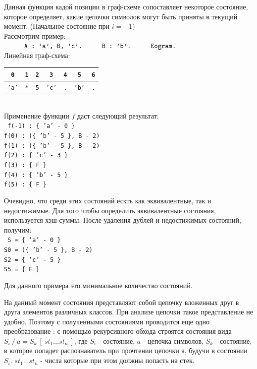 \documentclass[12pt]{article}
\newcommand\tab[1][1cm]{\hspace*{#1}}
\begin{document}
Данная функция кадой позиции в граф-схеме сопоставляет некоторое состояние, которое определяет, какие цепочки символов могут быть приняты в текущий момент. (Начальное состояние при $i = -1$)
\\

Рассмотрим пример:\\
$\tab \texttt{A  : 'a', B, 'c'.}\\
\tab \texttt{B : 'b'.}\\
\tab \texttt{Eogram.}
$\\

Линейная граф-схема:\\
\tab\begin{tabular}{|c|c|c|c|c|c|c|}
\hline
\texttt{0} & \texttt{1} & \texttt{2} & \texttt{3} & \texttt{4} & \texttt{5} & \texttt{6}\\
\hline
\texttt{'a'} & \texttt{*} & \texttt{5} & \texttt{'c'} & \texttt{.} & \texttt{'b'} & \texttt{.}\\
\hline
\end{tabular}\\

Применение функции $f$ даст следующий результат:\\
\texttt{
\tab f(-1) : \{ 'a' - 0 \}\\
\tab f(0)  : (\{ 'b' - 5 \}, B - 2)\\
\tab f(1)  : (\{ 'b' - 5 \}, B - 2)\\
\tab f(2)  : \{ 'c' - 3 \}\\
\tab f(3)  : \{ F \}\\
\tab f(4)  : \{ 'b' - 5 \}\\
\tab f(5)  : \{ F \}\\
}

Очевидно, что среди этих состояний ескть как эквивалентные, так и недостижимые. Для того чтобы определить эквивалентные состояния, используется хэш-суммы. После удаления дублей и недостижимых состояний, получим:\\
\texttt{
\tab S = \{ 'a' - 0 \}\\
\tab S0  = (\{ 'b' - 5 \}, B - 2)\\
\tab S2  = \{ 'c' - 5 \}\\
\tab S5  = \{ F \}\\
}

Для данного примера это минимальное количество состояний.

На данный момент состояния представляют собой цепочку вложенных друг в друга элементов различных классов. При анализе цепочки такое представление не удобно. Поэтому с полученными состояниями проводится еще одно преобразование : с помощью рекурсивного обхода строятся состояния вида $S_i\ /\ a = S_k\ [\ st_1 ... st_n\ ]$, где $S_i$ - состояние, $a$ - цепочка символов, $S_k$ - состояние, в которое попадет распознаватель при прочтении цепочки $а$, будучи в состоянии $S_i$. $st_1 ... st_n$ - числа которые при этом должны попасть на стек.
\\
\end{document}

